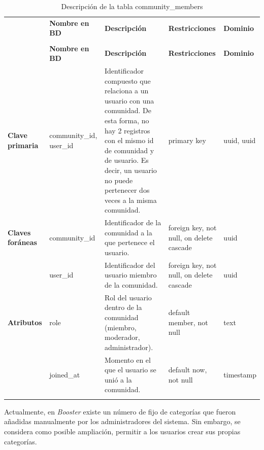 \begin{longtable}{|
>{\raggedright\arraybackslash}p{1.9cm}|
>{\raggedright\arraybackslash}p{2.7cm}|
>{\raggedright\arraybackslash}p{4.9cm}|
>{\raggedright\arraybackslash}p{2.7cm}|
>{\raggedright\arraybackslash}p{2.1cm}|
}
\hline

\rowcolor[gray]{0.75}
\multicolumn{5}{|c|}{\textbf{Miembros de comunidades}} \\
\hline

 & \textbf{Nombre en BD} & \textbf{Descripción} & \textbf{Restricciones} & \textbf{Dominio} \\
\hline
\endfirsthead

\hline
\rowcolor[gray]{0.75}
\multicolumn{5}{|c|}{\textbf{Miembros de comunidades}} \\
\hline

 & \textbf{Nombre en BD} & \textbf{Descripción} & \textbf{Restricciones} & \textbf{Dominio} \\
\hline
\endhead

\textbf{Clave primaria}
& community\_\allowbreak id, user\_\allowbreak id
& Identificador compuesto que relaciona a un usuario con una comunidad. De esta forma, no hay 2 registros con el mismo id de comunidad y de usuario. Es decir, un usuario no puede pertenecer dos veces a la misma comunidad. 
& primary key
& uuid, uuid \\
\hline

\textbf{Claves foráneas}
& community\_\allowbreak id
& Identificador de la comunidad a la que pertenece el usuario.
& foreign key, not null, on delete cascade
& uuid \\
\cline{2-5}

& user\_\allowbreak id
& Identificador del usuario miembro de la comunidad.
& foreign key, not null, on delete cascade
& uuid \\
\hline

\textbf{Atributos}
& role
& Rol del usuario dentro de la comunidad (miembro, moderador, administrador).
& default member, not null
& text \\
\cline{2-5}

& joined\_\allowbreak at
& Momento en el que el usuario se unió a la comunidad.
& default now, not null
& timestamp \\
\hline

\caption{Descripción de la tabla community\_members}
\end{longtable}



Actualmente, en \textit{Booster} existe un número de fijo de categorías que fueron añadidas manualmente por los administradores del sistema. Sin embargo, se considera como posible ampliación, permitir a los usuarios crear sus propias categorías. 

